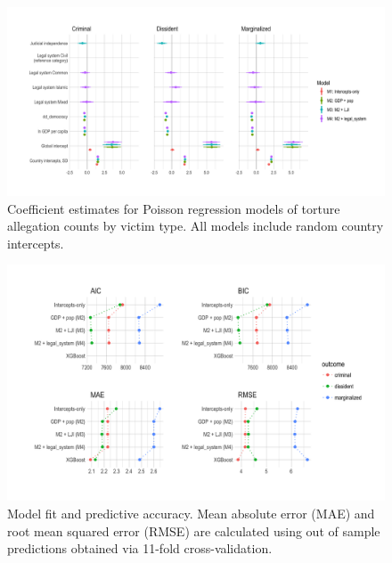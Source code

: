 \documentclass[12pt]{article}
\begin{document}
\begin{figure}
\begin{center}
\caption{Coefficient estimates for Poisson regression models of torture allegation counts by victim type. All models include random country intercepts.}
\label{fig:coefs}
\includegraphics[width=.99\textwidth]{../output/count-model-coefs.png}
\end{center}
\end{figure}

\begin{figure}
\begin{center}
\caption{Model fit and predictive accuracy. Mean absolute error (MAE) and root mean squared error (RMSE) are calculated using out of sample predictions obtained via 11-fold cross-validation.}
\label{fig:fit}
\includegraphics[width=.99\textwidth]{../output/model-fit-plot.png}
\end{center}
\end{figure}
\end{document}
